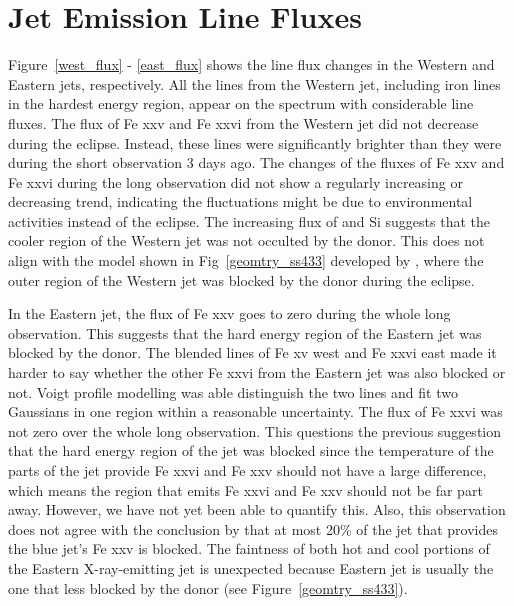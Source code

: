 \section{Jet Emission Line Fluxes}
Figure~\ref{west_flux} - \ref{east_flux} shows the line flux changes in the Western and Eastern jets, respectively. All the lines from the Western jet, including iron lines in the hardest energy region, appear on the spectrum with considerable line fluxes. The flux of Fe {\sc xxv} and Fe {\sc xxvi} from the Western jet did not decrease during the eclipse. Instead, these lines were significantly brighter than they were during the short observation 3 days ago. The changes of the fluxes of Fe {\sc xxv} and Fe {\sc xxvi} during the long observation did not show a regularly increasing or decreasing trend, indicating the fluctuations might be due to environmental activities instead of the eclipse. The increasing flux of and Si suggests that the cooler region of the Western jet was not occulted by the donor. This does not align with the model shown in Fig~\ref{geomtry_ss433} developed by \citep{Lopez2006}, where the outer region of the Western jet was blocked by the donor during the eclipse.\par 
In the Eastern jet, the flux of Fe {\sc xxv} goes to zero during the whole long observation. This suggests that the hard energy region of the Eastern jet was blocked by the donor. The blended lines of Fe {\sc xv} west and Fe {\sc xxvi} east made it harder to say whether the other Fe {\sc xxvi} from the Eastern jet was also blocked or not. Voigt profile modelling was able distinguish the two lines and fit two Gaussians in one region within a reasonable uncertainty. The flux of Fe {\sc xxvi} was not zero over the whole long observation. This questions the previous suggestion that the hard energy region of the jet was blocked since the temperature of the parts of the jet provide Fe {\sc xxvi} and Fe {\sc xxv} should not have a large difference, which means the region that emits Fe {\sc xxvi} and Fe {\sc xxv} should not be far part away. However, we have not yet been able to quantify this. Also, this observation does not agree with the conclusion by \citep{Marshall2013} that at most 20\% of the jet that provides the blue jet's Fe {\sc xxv} is blocked. The faintness of both hot and cool portions of the Eastern X-ray-emitting jet is unexpected because Eastern jet is usually the one that less blocked by the donor (see Figure~\ref{geomtry_ss433}).

